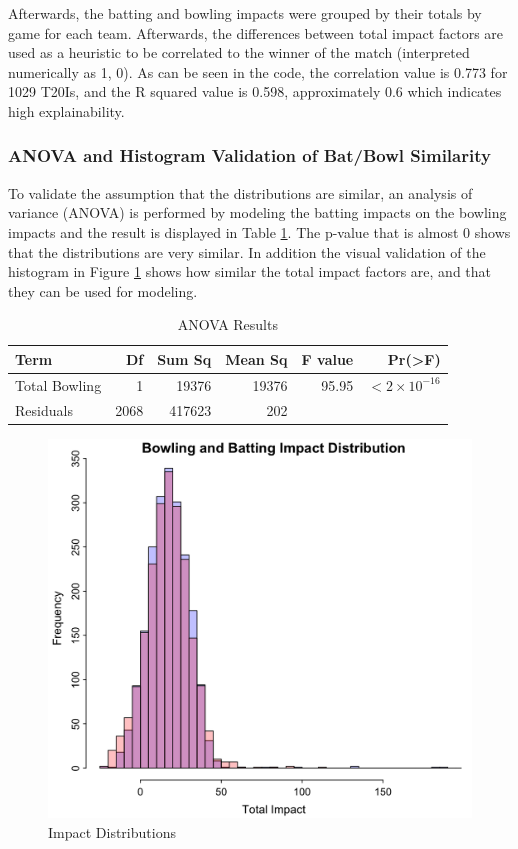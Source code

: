 \documentclass{article}[12pt]
\begin{document}
Afterwards, the batting and bowling impacts were grouped by their totals by game for each team. Afterwards, the differences between total impact factors are used as a heuristic to be correlated to the winner of the match (interpreted numerically as 1, 0). As can be seen in the code, the correlation value is 0.773 for 1029 T20Is, and the R squared value is 0.598, approximately 0.6 which indicates high explainability.

\subsubsection{ANOVA and Histogram Validation of Bat/Bowl Similarity}
To validate the assumption that the distributions are similar, an analysis of variance (ANOVA) is performed by modeling the batting impacts on the bowling impacts and the result is displayed in Table \ref{tab:anova_results}. The p-value that is almost 0 shows that the distributions are very similar. In addition the visual validation of the histogram in Figure \ref{fig:imdist} shows how similar the total impact factors are, and that they can be used for modeling.
\begin{table}[!ht]
\centering
\begin{tabular}{lrrrrr}
\textbf{Term} & \textbf{Df} & \textbf{Sum Sq} & \textbf{Mean Sq} & \textbf{F value} & \textbf{Pr(>F)} \\
\hline
Total Bowling & 1 & 19376 & 19376 & 95.95 & $< 2 \times 10^{-16}$ \\
Residuals & 2068 & 417623 & 202 & & \\
\hline
\end{tabular}
\caption{ANOVA Results}
\label{tab:anova_results}
\end{table}
\begin{figure}[!ht]
    \centering
    \includegraphics[width=0.5\linewidth]{impact_dist.png}
    \caption{Impact Distributions}
    \label{fig:imdist}
\end{figure}
\end{document}
